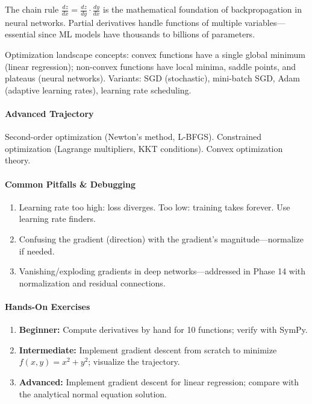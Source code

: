 \documentclass[11pt, a4paper, oneside]{report}
\begin{document}
The chain rule $\frac{dz}{dx} = \frac{dz}{dy} \cdot \frac{dy}{dx}$ is the mathematical foundation of backpropagation in neural networks. Partial derivatives handle functions of multiple variables---essential since ML models have thousands to billions of parameters.

Optimization landscape concepts: convex functions have a single global minimum (linear regression); non-convex functions have local minima, saddle points, and plateaus (neural networks). Variants: SGD (stochastic), mini-batch SGD, Adam (adaptive learning rates), learning rate scheduling.

\paragraph{Advanced Trajectory} Second-order optimization (Newton's method, L-BFGS). Constrained optimization (Lagrange multipliers, KKT conditions). Convex optimization theory.

\paragraph{Common Pitfalls \& Debugging}
\begin{enumerate}[leftmargin=*]
\item Learning rate too high: loss diverges. Too low: training takes forever. Use learning rate finders.
\item Confusing the gradient (direction) with the gradient's magnitude---normalize if needed.
\item Vanishing/exploding gradients in deep networks---addressed in Phase 14 with normalization and residual connections.
\end{enumerate}

\paragraph{Hands-On Exercises}
\begin{enumerate}[leftmargin=*]
\item \textbf{Beginner:} Compute derivatives by hand for 10 functions; verify with SymPy.
\item \textbf{Intermediate:} Implement gradient descent from scratch to minimize $f(x,y) = x^2 + y^2$; visualize the trajectory.
\item \textbf{Advanced:} Implement gradient descent for linear regression; compare with the analytical normal equation solution.
\end{enumerate}
\end{document}
